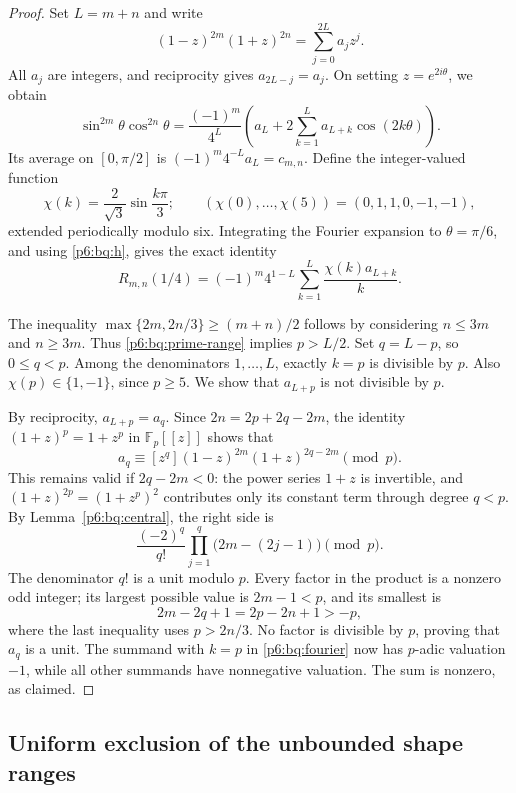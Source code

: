 \documentclass[11pt,a4paper]{article}
\theoremstyle{definition}
\theoremstyle{remark}
\numberwithin{equation}{section}
\begin{document}
\begin{proof}
Set $L=m+n$ and write
\[
 (1-z)^{2m}(1+z)^{2n}=\sum_{j=0}^{2L}a_jz^j.
\]
All $a_j$ are integers, and reciprocity gives
$a_{2L-j}=a_j$. On setting $z=e^{2i\theta}$, we obtain
\[
 \sin^{2m}\theta\cos^{2n}\theta
  =\frac{(-1)^m}{4^L}
       \left(a_L+2\sum_{k=1}^L a_{L+k}\cos(2k\theta)\right).
\]
Its average on $[0,\pi/2]$ is $(-1)^m4^{-L}a_L=c_{m,n}$.
Define the integer-valued function
\[
 \chi(k)=\frac{2}{\sqrt3}\sin\frac{k\pi}{3};
 \qquad (\chi(0),\ldots,\chi(5))=(0,1,1,0,-1,-1),
\]
extended periodically modulo six. Integrating the Fourier
expansion to $\theta=\pi/6$, and using
\eqref{p6:bq:h}, gives the exact identity
\begin{equation}\label{p6:bq:fourier}
 R_{m,n}(1/4)
   =(-1)^m4^{1-L}\sum_{k=1}^L\frac{\chi(k)a_{L+k}}k.
\end{equation}

The inequality
$\max\{2m,2n/3\}\ge(m+n)/2$ follows by considering
$n\le3m$ and $n\ge3m$. Thus \eqref{p6:bq:prime-range} implies
$p>L/2$. Set $q=L-p$, so $0\le q<p$. Among the denominators
$1,\ldots,L$, exactly $k=p$ is divisible by $p$.
Also $\chi(p)\in\{1,-1\}$, since $p\ge5$.
We show that $a_{L+p}$ is not divisible by $p$.

By reciprocity, $a_{L+p}=a_q$. Since
$2n=2p+2q-2m$, the identity $(1+z)^p=1+z^p$ in
$\mathbb F_p[[z]]$ shows that
\begin{equation}\label{p6:bq:modp}
 a_q\equiv[z^q](1-z)^{2m}(1+z)^{2q-2m}\pmod p.
\end{equation}
This remains valid if $2q-2m<0$: the power series $1+z$
is invertible, and $(1+z)^{2p}=(1+z^p)^2$ contributes
only its constant term through degree $q<p$.
By Lemma~\ref{p6:bq:central}, the right side is
\[
 \frac{(-2)^q}{q!}\prod_{j=1}^q\bigl(2m-(2j-1)\bigr)
 \pmod p.
\]
The denominator $q!$ is a unit modulo $p$. Every factor in
the product is a nonzero odd integer; its largest possible value
is $2m-1<p$, and its smallest is
\[
 2m-2q+1=2p-2n+1>-p,
\]
where the last inequality uses $p>2n/3$.
No factor is divisible by $p$, proving that $a_q$ is a unit.
The summand with $k=p$ in \eqref{p6:bq:fourier} now has
$p$-adic valuation $-1$, while all other summands have
nonnegative valuation. The sum is nonzero, as claimed.
\end{proof}

\subsection{Uniform exclusion of the unbounded shape ranges}
\end{document}
